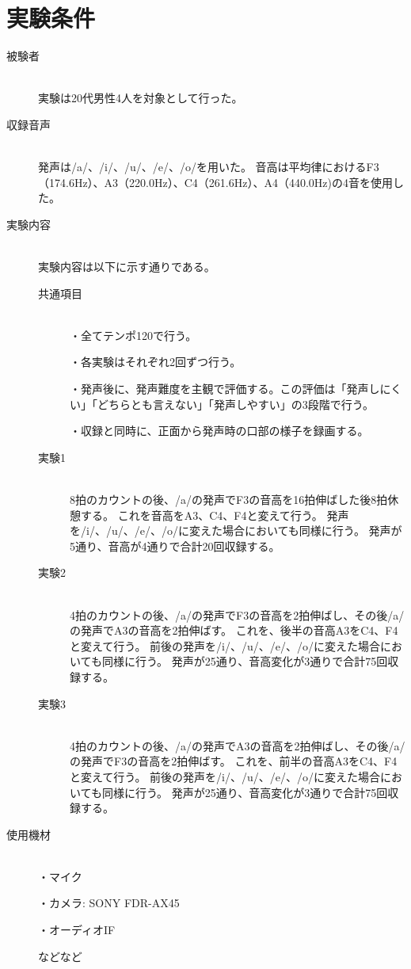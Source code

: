 \documentclass[10ptj,a4j,dvipdfmx,uplatex, oneside, openany]{jsbook}%
\begin{document}
\section{実験条件}
\begin{description}
    \item[被験者]\mbox{}\\
        実験は20代男性4人を対象として行った。
    \item[収録音声]\mbox{}\\
        発声は/a/、/i/、/u/、/e/、/o/を用いた。
        音高は平均律におけるF3（174.6Hz）、A3（220.0Hz）、C4（261.6Hz）、A4（440.0Hz)の4音を使用した。
    \item[実験内容]\mbox{}\\
        実験内容は以下に示す通りである。
        \begin{description}
            \item[共通項目]\mbox{}\\
                ・全てテンポ120で行う。
                
                ・各実験はそれぞれ2回ずつ行う。
                
                ・発声後に、発声難度を主観で評価する。この評価は「発声しにくい」「どちらとも言えない」「発声しやすい」の3段階で行う。
                
                ・収録と同時に、正面から発声時の口部の様子を録画する。
            \item[実験1]\mbox{}\\
                8拍のカウントの後、/a/の発声でF3の音高を16拍伸ばした後8拍休憩する。
                これを音高をA3、C4、F4と変えて行う。
                発声を/i/、/u/、/e/、/o/に変えた場合においても同様に行う。
                発声が5通り、音高が4通りで合計20回収録する。
            \item[実験2]\mbox{}\\
                4拍のカウントの後、/a/の発声でF3の音高を2拍伸ばし、その後/a/の発声でA3の音高を2拍伸ばす。
                これを、後半の音高A3をC4、F4と変えて行う。
                前後の発声を/i/、/u/、/e/、/o/に変えた場合においても同様に行う。
                発声が25通り、音高変化が3通りで合計75回収録する。
            \item[実験3]\mbox{}\\
                4拍のカウントの後、/a/の発声でA3の音高を2拍伸ばし、その後/a/の発声でF3の音高を2拍伸ばす。
                これを、前半の音高A3をC4、F4と変えて行う。
                前後の発声を/i/、/u/、/e/、/o/に変えた場合においても同様に行う。
                発声が25通り、音高変化が3通りで合計75回収録する。
        \end{description}

    \item[使用機材]\mbox{}\\
        ・マイク

        ・カメラ: SONY FDR-AX45

        ・オーディオIF

        などなど
\end{description}
\end{document}

